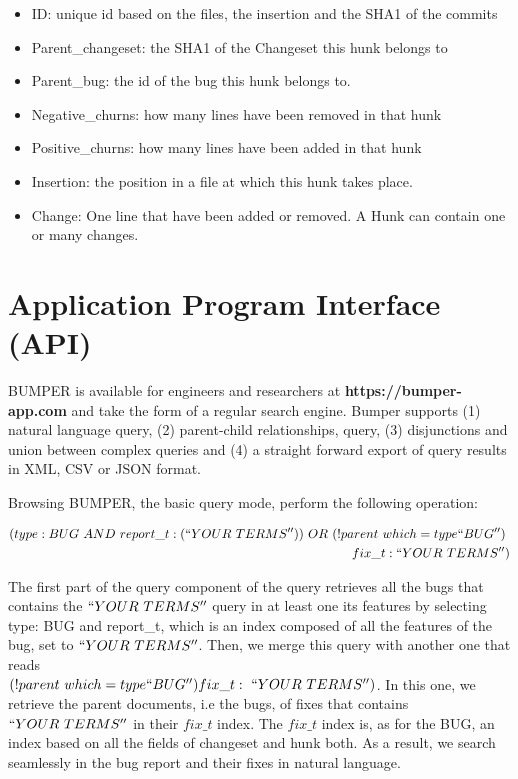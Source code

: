 \begin{itemize}
\item ID: unique id based on the files, the insertion and the SHA1 of the commits
\item Parent\_changeset: the SHA1 of the Changeset this hunk belongs to
\item Parent\_bug: the id of the bug this hunk belongs to.
\item Negative\_churns: how many lines have been removed in that hunk
\item Positive\_churns: how many lines have been added in that hunk
\item Insertion: the position in a file at which this hunk takes place.
\item Change: One line that have been added or removed. A Hunk can contain one or many changes.
\end{itemize}

\section{Application Program Interface (API)\label{sec:bumper-api}}

BUMPER is available for engineers and researchers at {\bf https://bumper-app.com} and take the form of a regular search engine. Bumper supports (1) natural language query, (2) parent-child relationships, query, (3) disjunctions and union between complex queries and (4) a straight forward export of query results in XML, CSV or JSON format.

Browsing BUMPER, the basic query mode, perform the following operation:

\begin{equation}
\begin{split}
(type:BUG~AND~report\_t:(``YOUR~TERMS''))~OR~(!parent~which=type``BUG'')~\\fix\_t:``YOUR~TERMS'')
\end{split}
\end{equation}

The first part of the query component of the query retrieves all the bugs that contains the $``YOUR~TERMS''$ query in at least one its features by selecting type: BUG and report\_t, which is an index composed of all the features of the bug, set to $``YOUR~TERMS''$.
Then, we merge this query with another one that reads \\
$(!parent~which=type``BUG'')fix\_t:~``YOUR~TERMS'')$.
In this one, we retrieve the parent documents, i.e the bugs, of fixes that contains $``YOUR~TERMS''$ in their $fix\_t$ index.
The $fix\_t$ index is, as for the BUG, an index based on all the fields of changeset and hunk both. As a result, we search seamlessly in the bug report and their fixes in natural language.

